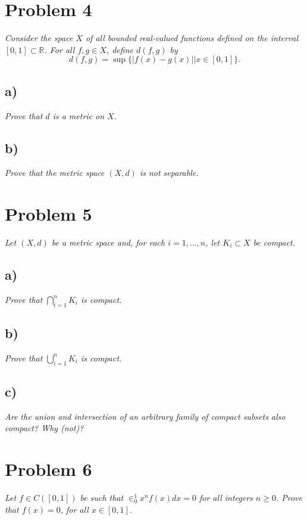 \documentclass[12pt]{article}
\begin{document}
\section*{Problem 4}
{\it Consider the space $X$ of all bounded real-valued functions defined on the interval $[0,1] \subset \mathbb{R}$.  For all $f,g \in X$, define $d(f,g)$ by}
\begin{equation}
	\label{problem_4_definition}
	d(f, g) = \sup\{|f(x) - g(x)| | x \in [0,1]\}.
\end{equation}

\subsection*{ a)}
{\it Prove that $d$ is a metric on $X$.}

\subsection*{ b)}
{\it Prove that the metric space $(X, d)$ is not separable.}

\section*{Problem 5}
{\it Let $(X,d)$ be a metric space and, for each $i = 1, \dots, n$, let $K_i \subset X$ be compact.}

\subsection*{ a)}
{\it Prove that $\bigcap_{i=1}^{n}K_i$ is compact.}

\subsection*{ b)}
{\it Prove that $\bigcup_{i=1}^{n}K_i$ is compact.}

\subsection*{ c)}
{\it Are the union and intersection of an arbitrary family of compact subsets also compact?  Why (not)?}

\section*{Problem 6}
{\it Let $f \in C([0,1])$ be such that $\in_0^1x^nf(x)dx = 0$ for all integers $n \geq 0$.  Prove that $f(x) = 0$, for all $x \in [0,1]$.}
\end{document}
